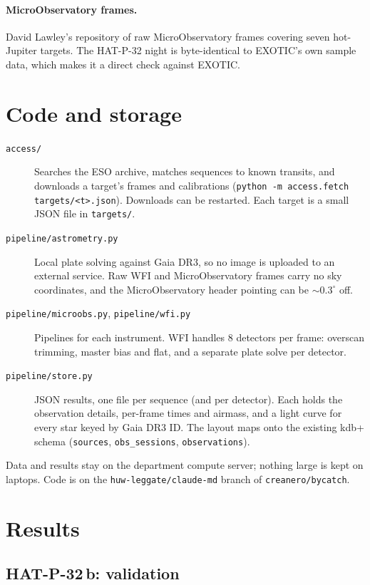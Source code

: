 \documentclass[11pt,a4paper]{article}
\begin{document}
\paragraph{MicroObservatory frames.}
David Lawley's repository of raw MicroObservatory frames covering seven
hot-Jupiter targets. The HAT-P-32 night is byte-identical to EXOTIC's own
sample data, which makes it a direct check against EXOTIC.

\section{Code and storage}

\begin{description}
  \item[\texttt{access/}] Searches the ESO archive, matches sequences to
        known transits, and downloads a target's frames and calibrations
        (\texttt{python -m access.fetch targets/<t>.json}). Downloads can be
        restarted. Each target is a small JSON file in \texttt{targets/}.
  \item[\texttt{pipeline/astrometry.py}] Local plate solving against Gaia
        DR3, so no image is uploaded to an external service. Raw WFI and
        MicroObservatory frames carry no sky coordinates, and the
        MicroObservatory header pointing can be ${\sim}0.3^\circ$ off.
  \item[\texttt{pipeline/microobs.py}, \texttt{pipeline/wfi.py}] Pipelines
        for each instrument. WFI handles 8 detectors per frame: overscan
        trimming, master bias and flat, and a separate plate solve per
        detector.
  \item[\texttt{pipeline/store.py}] JSON results, one file per sequence (and
        per detector). Each holds the observation details, per-frame
        times and airmass, and a light curve for every star keyed by Gaia DR3
        ID. The layout maps onto the existing kdb+ schema
        (\texttt{sources}, \texttt{obs\_sessions}, \texttt{observations}).
\end{description}

Data and results stay on the department compute server; nothing large is
kept on laptops. Code is on the \texttt{huw-leggate/claude-md} branch of
\texttt{creanero/bycatch}.

\section{Results}

\subsection{HAT-P-32\,b: validation}
\end{document}
